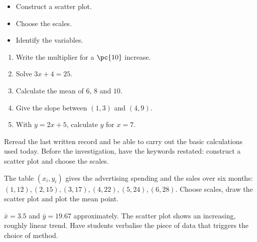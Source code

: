 \begin{objectives}\begin{itemize}\item Construct a scatter plot.\item Choose the scales.\item Identify the variables.\end{itemize}\end{objectives}
\begin{fluency}\begin{enumerate}\item Write the multiplier for a $\pc{10}$ increase. \item Solve $3x+4=25$. \item Calculate the mean of $6$, $8$ and $10$. \item Give the slope between $(1,3)$ and $(4,9)$. \item With $y=2x+5$, calculate $y$ for $x=7$. \end{enumerate}\end{fluency}
\begin{prerequisites}Reread the last written record and be able to carry out the basic calculations used today. Before the investigation, have the keywords restated: construct a scatter plot and choose the scales.\end{prerequisites}

\begin{activity}
The table $(x_i,y_i)$ gives the advertising spending and the sales over six months: $(1,12),(2,15),(3,17),(4,22),(5,24),(6,28)$. Choose scales, draw the scatter plot and plot the mean point.
\begin{center}\end{center}
\end{activity}
\begin{solution}$\bar x=\num{3,5}$ and $\bar y=\num{19,67}$ approximately. The scatter plot shows an increasing, roughly linear trend. Have students verbalise the piece of data that triggers the choice of method.\end{solution}

